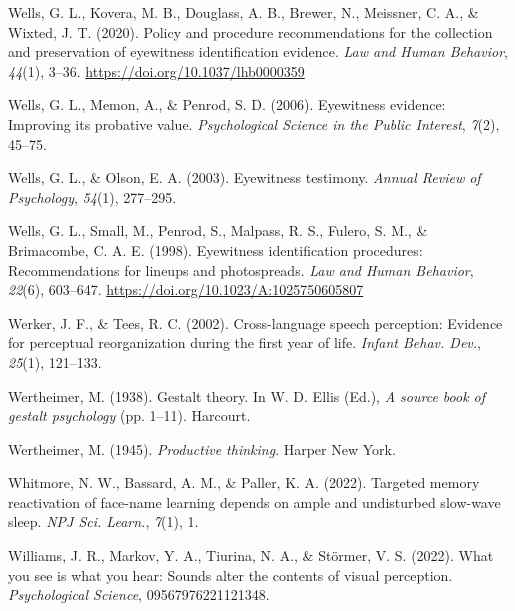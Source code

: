 \documentclass[
]{krantz}
\newlength{\cslhangindent}
\newlength{\cslentryspacingunit} %
\newenvironment{CSLReferences}[2] %
 {%
  \setlength{\parindent}{0pt}
  \ifodd #1
  \let\oldpar\par
  \def\par{\hangindent=\cslhangindent\oldpar}
  \fi
  \setlength{\parskip}{#2\cslentryspacingunit}
 }%
 {}
\begin{document}
\begin{CSLReferences}{1}{0}
\leavevmode{}%
Wells, G. L., Kovera, M. B., Douglass, A. B., Brewer, N., Meissner, C. A., \& Wixted, J. T. (2020). Policy and procedure recommendations for the collection and preservation of eyewitness identification evidence. \emph{Law and Human Behavior}, \emph{44}(1), 3--36. \url{https://doi.org/10.1037/lhb0000359}

\leavevmode{}%
Wells, G. L., Memon, A., \& Penrod, S. D. (2006). Eyewitness evidence: Improving its probative value. \emph{Psychological Science in the Public Interest}, \emph{7}(2), 45--75.

\leavevmode{}%
Wells, G. L., \& Olson, E. A. (2003). Eyewitness testimony. \emph{Annual Review of Psychology}, \emph{54}(1), 277--295.

\leavevmode{}%
Wells, G. L., Small, M., Penrod, S., Malpass, R. S., Fulero, S. M., \& Brimacombe, C. A. E. (1998). Eyewitness identification procedures: Recommendations for lineups and photospreads. \emph{Law and Human Behavior}, \emph{22}(6), 603--647. \url{https://doi.org/10.1023/A:1025750605807}

\leavevmode{}%
Werker, J. F., \& Tees, R. C. (2002). Cross-language speech perception: Evidence for perceptual reorganization during the first year of life. \emph{Infant Behav. Dev.}, \emph{25}(1), 121--133.

\leavevmode{}%
Wertheimer, M. (1938). Gestalt theory. In W. D. Ellis (Ed.), \emph{A source book of gestalt psychology} (pp. 1--11). Harcourt.

\leavevmode{}%
Wertheimer, M. (1945). \emph{Productive thinking}. Harper New York.

\leavevmode{}%
Whitmore, N. W., Bassard, A. M., \& Paller, K. A. (2022). Targeted memory reactivation of face-name learning depends on ample and undisturbed slow-wave sleep. \emph{NPJ Sci. Learn.}, \emph{7}(1), 1.

\leavevmode{}%
Williams, J. R., Markov, Y. A., Tiurina, N. A., \& Störmer, V. S. (2022). What you see is what you hear: Sounds alter the contents of visual perception. \emph{Psychological Science}, 09567976221121348.


\end{CSLReferences}
\end{document}
